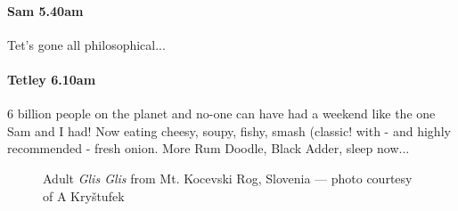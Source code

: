 \paragraph{Sam 5.40am}
Tet’s gone all philosophical...


\paragraph{Tetley 6.10am}
6 billion people on the planet and no-one can have had a weekend like the one Sam and I had! Now eating cheesy, soupy, fishy, smash (classic! with - and highly recommended - fresh onion. More Rum Doodle, Black Adder, sleep now...

\begin{figure}[t!]
\checkoddpage \ifoddpage \forcerectofloat \else \forceversofloat \fi
\centering
{}
\caption{Adult \emph{Glis Glis} from Mt. Kocevski Rog, Slovenia --- photo courtesy of A Kry\v{s}tufek  }
\label{dormouse}
\end{figure}

